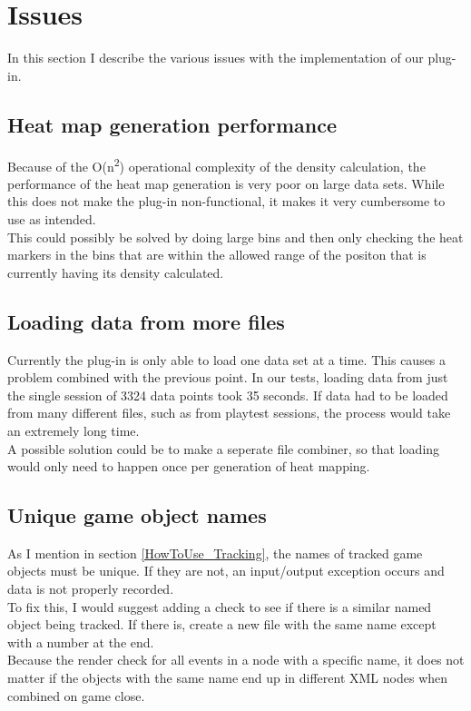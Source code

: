 \section{Issues}
\label{Issues}
In this section I describe the various issues with the implementation of our plug-in.
\subsection{Heat map generation performance}
\label{Issues_generationPerformance}
Because of the O(n\textsuperscript{2}) operational complexity of the density calculation, the performance of the heat map generation is very poor on large data sets. While this does not make the plug-in non-functional, it makes it very cumbersome to use as intended. 
\\This could possibly be solved by doing large bins and then only checking the heat markers in the bins that are within the allowed range of the positon that is currently having its density calculated.

\subsection{Loading data from more files}
\label{Issues_MoreFiles}
Currently the plug-in is only able to load one data set at a time. This causes a problem combined with the previous point. In our tests, loading data from just the single session of 3324 data points took 35 seconds. If data had to be loaded from many different files, such as from playtest sessions, the process would take an extremely long time. 
\\A possible solution could be to make a seperate file combiner, so that loading would only need to happen once per generation of heat mapping.

\subsection{Unique game object names}
\label{Issues_UniqueNames}
As I mention in section \ref{HowToUse_Tracking}, the names of tracked game objects must be unique. If they are not, an input/output exception occurs and data is not properly recorded. 
\\To fix this, I would suggest adding a check to see if there is a similar named object being tracked. If there is, create a new file with the same name except with a number at the end. 
\\Because the render check for all events in a node with a specific name, it does not matter if the objects with the same name end up in different XML nodes when combined on game close.


